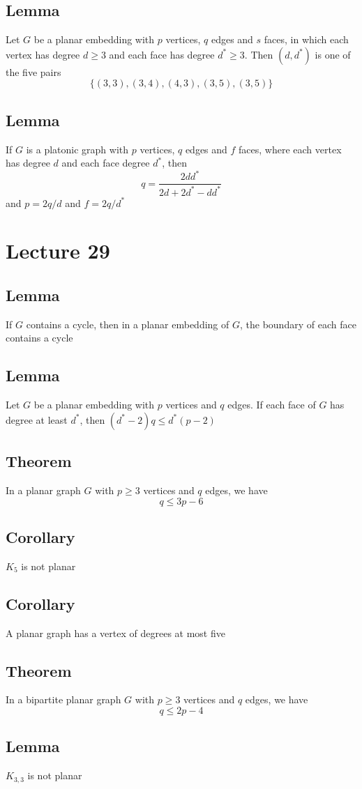 \documentclass[11pt]{article}
\begin{document}
\subsection{Lemma}
Let $G$ be a planar embedding with $p$ vertices, $q$ edges and $s$ faces, in which each vertex has degree $d\geq3$ and each face has degree $d^*\geq3$. Then $(d,d^*)$ is one of the five pairs 
\[\{(3,3),(3,4),(4,3),(3,5),(3,5)\}\]
\subsection{Lemma}
If $G$ is a platonic graph with $p$ vertices, $q$ edges and $f$ faces, where each vertex has degree $d$ and each face degree $d^*$, then 
\[q = \frac{2dd^*}{2d + 2d^* - dd^*}\]
and $p = 2q/d$ and $f = 2q/d^*$

\section{Lecture 29}
\subsection{Lemma}
If $G$ contains a cycle, then in a planar embedding of $G$, the boundary of each face contains a cycle 
\subsection{Lemma}
Let $G$ be a planar embedding with $p$ vertices and $q$ edges. If each face of $G$ has degree at least $d^*$, then $(d^*-2)q\leq d^*(p-2)$
\subsection{Theorem}
In a planar graph $G$ with $p\geq3$ vertices and $q$ edges, we have \[q\leq 3p-6\] 
\subsection{Corollary}
$K_5$ is not planar
\subsection{Corollary}
A planar graph has a vertex of degrees at most five 
\subsection{Theorem}
In a bipartite planar graph $G$ with $p\geq3$ vertices and $q$ edges, we have \[q\leq 2p-4\]
\subsection{Lemma}
$K_{3,3}$ is not planar
\end{document}
